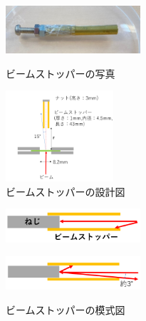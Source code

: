 \documentclass[a4paper,11pt,dvipdfmx]{jsarticle}
\begin{document}
\begin{figure}[H]
 \begin{minipage}{0.5\hsize}
  \begin{center}
   \includegraphics[width=50mm]{picture/setup/stopperphoto.jpg}
  \end{center}
  \caption{ビームストッパーの写真}
  \label{stphoto}
 \end{minipage}
 \begin{minipage}{0.5\hsize}
  \begin{center}
   \includegraphics[width=40mm]{picture/setup/stoppersekkei.png}
  \end{center}
  \caption{ビームストッパーの設計図\cite{2019}}
  \label{stsekkei}
 \end{minipage}
\end{figure}

\begin{figure}[H]
  \begin{minipage}{0.5\hsize}
    \centering
    \includegraphics[width=50mm]{picture/setup/stoppermoshi1.png}\\
    \label{stmoshi1}
  \end{minipage}
  \begin{minipage}{0.5\hsize}
    \centering
    \includegraphics[width=50mm]{picture/setup/stoppermoshi2.png}\\
    \label{stmoshi2}
  \end{minipage}
  \caption{ビームストッパーの模式図\cite{2019}}
\end{figure}
\end{document}
